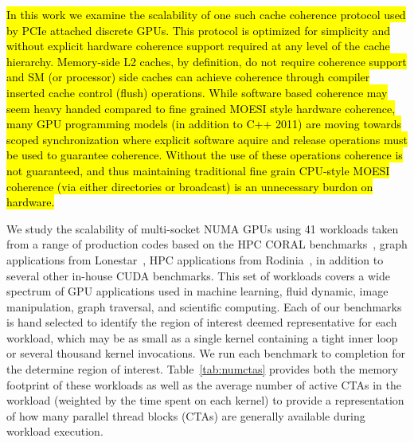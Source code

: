 \hl{In this work we examine the scalability of one such cache coherence 
protocol used by PCIe attached discrete GPUs. This protocol is optimized for simplicity
and without explicit hardware coherence support required at any level of the cache hierarchy.  
Memory-side L2 caches, by definition, do not require 
coherence support and SM (or processor) side caches can achieve coherence through 
compiler inserted cache control (flush) operations.  While software based 
coherence may seem heavy handed compared to fine grained MOESI style hardware 
coherence, many GPU programming models (in addition to C++ 2011) are moving 
towards scoped synchronization where explicit software aquire and release 
operations must be used to guarantee coherence.  Without the use of these 
operations coherence is not guaranteed, and thus maintaining traditional fine 
grain CPU-style MOESI coherence (via either directories or broadcast) is an 
unnecessary burdon on hardware.}

We study the scalability of multi-socket NUMA GPUs using 41 workloads 
taken from a range of 
production codes based on the HPC CORAL benchmarks~\cite{coral}, graph 
applications from Lonestar~\cite{lonestar}, HPC applications from 
Rodinia~\cite{Che2009}, in addition to several other in-house CUDA benchmarks. 
This set of workloads covers a wide spectrum of GPU applications used in 
machine learning, fluid dynamic, image manipulation, graph traversal, and
scientific computing.  Each of our benchmarks is hand selected to identify
the region of interest deemed representative for each workload, which may
be as small as a single kernel containing a tight inner loop or several thousand
kernel invocations.  We run each benchmark to completion for the determine
region of interest. Table~\ref{tab:numctas} provides both the memory footprint
of these workloads as well as the average number of active CTAs in the workload
(weighted by the time spent on each kernel) to provide a representation of 
how many parallel thread blocks (CTAs) are generally available
during workload execution.

